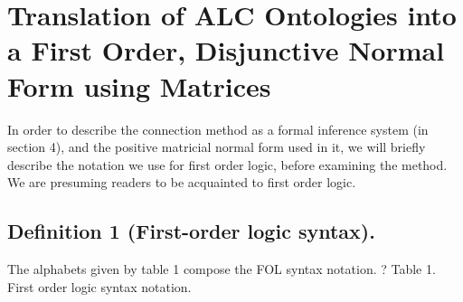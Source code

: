 \chapter{Translation of ALC Ontologies into a First Order, Disjunctive Normal Form using Matrices}
\label{ch:translation}

In order to describe the connection method as a formal inference system (in section 4), and the positive matricial normal form used in it, we will briefly describe the notation we use for first order logic, before examining the method. We are presuming readers to be acquainted to first order logic.

\section{Definition 1 (First-order logic syntax).}
The alphabets given by table 1 compose the FOL syntax notation.	? Table 1. First order logic syntax notation.